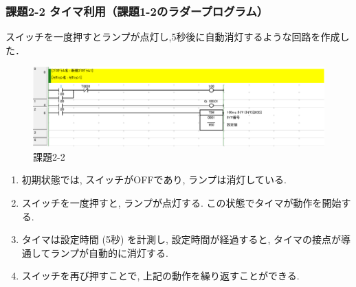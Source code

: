 \subsubsection*{課題2-2 タイマ利用（課題1-2のラダープログラム）}
スイッチを一度押すとランプが点灯し,5秒後に自動消灯するような回路を作成した．
\begin{figure}[H]
  \centering
  \includegraphics[scale=1]{sozai/2-2-crop.pdf}
  \caption{課題2-2}
\end{figure}

\begin{enumerate}
  \item 初期状態では, スイッチがOFFであり, ランプは消灯している.
  \item スイッチを一度押すと, ランプが点灯する. この状態でタイマが動作を開始する.
  \item タイマは設定時間 (5秒) を計測し, 設定時間が経過すると, タイマの接点が導通してランプが自動的に消灯する.
  \item スイッチを再び押すことで, 上記の動作を繰り返すことができる.
\end{enumerate}


